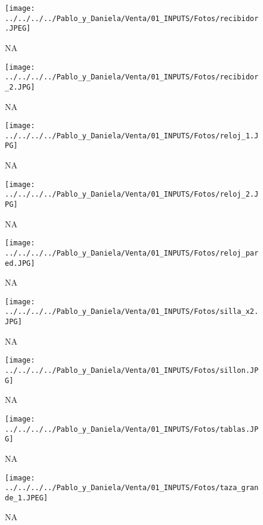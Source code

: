 \documentclass[
]{article}
\begin{document}
\pagebreak

\begin{figure}
\centering
\texttt{[image: ../../../../Pablo\_y\_Daniela/Venta/01\_INPUTS/Fotos/recibidor.JPEG]}
\caption{NA}
\end{figure}

\pagebreak

\begin{figure}
\centering
\texttt{[image: ../../../../Pablo\_y\_Daniela/Venta/01\_INPUTS/Fotos/recibidor\_2.JPG]}
\caption{NA}
\end{figure}

\pagebreak

\begin{figure}
\centering
\texttt{[image: ../../../../Pablo\_y\_Daniela/Venta/01\_INPUTS/Fotos/reloj\_1.JPG]}
\caption{NA}
\end{figure}

\pagebreak

\begin{figure}
\centering
\texttt{[image: ../../../../Pablo\_y\_Daniela/Venta/01\_INPUTS/Fotos/reloj\_2.JPG]}
\caption{NA}
\end{figure}

\pagebreak

\begin{figure}
\centering
\texttt{[image: ../../../../Pablo\_y\_Daniela/Venta/01\_INPUTS/Fotos/reloj\_pared.JPG]}
\caption{NA}
\end{figure}

\pagebreak

\begin{figure}
\centering
\texttt{[image: ../../../../Pablo\_y\_Daniela/Venta/01\_INPUTS/Fotos/silla\_x2.JPG]}
\caption{NA}
\end{figure}

\pagebreak

\begin{figure}
\centering
\texttt{[image: ../../../../Pablo\_y\_Daniela/Venta/01\_INPUTS/Fotos/sillon.JPG]}
\caption{NA}
\end{figure}

\pagebreak

\begin{figure}
\centering
\texttt{[image: ../../../../Pablo\_y\_Daniela/Venta/01\_INPUTS/Fotos/tablas.JPG]}
\caption{NA}
\end{figure}

\pagebreak

\begin{figure}
\centering
\texttt{[image: ../../../../Pablo\_y\_Daniela/Venta/01\_INPUTS/Fotos/taza\_grande\_1.JPEG]}
\caption{NA}
\end{figure}
\end{document}
